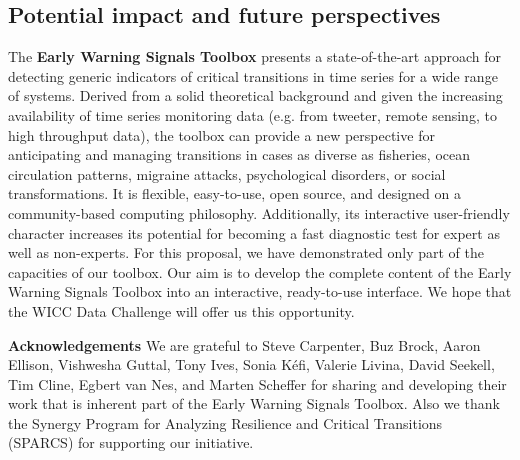 \documentclass[12pt,a4paper,final]{article}
\begin{document}
\begin{doublespacing}
\section{Potential impact and future perspectives}
The \textbf{Early Warning Signals Toolbox} presents a state-of-the-art approach for detecting generic indicators of critical transitions in time series for a wide range of systems. Derived from a solid theoretical background and given the increasing availability of time series monitoring data (e.g. from tweeter, remote sensing, to high throughput data), the toolbox can provide a new perspective for anticipating and managing transitions in cases as diverse as fisheries, ocean circulation patterns, migraine attacks, psychological disorders, or social transformations. It is flexible, easy-to-use, open source, and designed on a community-based computing philosophy. Additionally, its interactive user-friendly character increases its potential for becoming a fast diagnostic test for expert as well as non-experts. For this proposal, we have demonstrated only part of the capacities of our toolbox. Our aim is to develop the complete content of the Early Warning Signals Toolbox into an interactive, ready-to-use interface. We hope that the WICC Data Challenge will offer us this opportunity.\\

\end{doublespacing}

{\small
\textbf{Acknowledgements}
We are grateful to Steve Carpenter, Buz Brock, Aaron Ellison, Vishwesha Guttal, Tony Ives, Sonia K\'{e}fi, Valerie Livina, David Seekell, Tim Cline, Egbert van Nes, and Marten Scheffer for sharing and developing their work that is inherent part of the Early Warning Signals Toolbox. Also we thank the Synergy Program for Analyzing Resilience and Critical Transitions  (SPARCS) for supporting our initiative.



}
\end{document}
